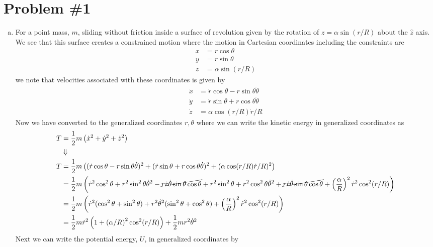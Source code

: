 \documentclass[11pt]{article}
\numberwithin{equation}{section}
\begin{document}


\section{Problem \#1}
\begin{enumerate}[(a)]
\item For a point mass, $m$, sliding without friction inside a surface of revolution given 
by the rotation of $z=\alpha\sin(r/R)$ about the $\hat{z}$ axis. We see that this surface
creates a constrained motion where the motion in Cartesian coordinates including the 
constraints are
\begin{align*} 
x &= r\cos\theta\\
y &= r\sin\theta\\
z &= \alpha\sin(r/R)
\end{align*} 
we note that velocities associated with these coordinates is given by
\begin{align*}
\dot{x} &= \dot{r}\cos\theta-r\sin\theta\dot\theta\\
\dot{y} &= \dot{r}\sin\theta+r\cos\theta\dot\theta\\
\dot{z} &= \alpha\cos(r/R)\dot{r}/R
\end{align*}
Now we have converted to the generalized coordinates $r,\theta$ where we can write the 
kinetic energy in generalized coordinates as
\begin{align*}
T &= \frac{1}{2}m\left(\dot{x}^2+\dot{y}^2+\dot{z}^2\right)\\
&\Downarrow\\
T &= \frac{1}{2}m\left((\dot{r}\cos\theta-r\sin\theta\dot\theta)^2+(\dot{r}\sin\theta+r\cos\theta\dot\theta)^2+(\alpha\cos(r/R)\dot{r}/R)^2\right)\\
&= \frac{1}{2}m\left(\dot{r}^2\cos^2\theta + r^2\sin^2\theta\dot\theta^2 - \cancel{r\dot{r}\dot{\theta}\sin\theta\cos\theta} + \dot{r}^2\sin^2\theta + r^2\cos^2\theta\dot\theta^2 + \cancel{r\dot{r}\dot{\theta}\sin\theta\cos\theta} + \left(\frac{\alpha}{R}\right)^2\dot{r}^2\cos^2(r/R)\right)\\
&= \frac{1}{2}m\left(\dot{r}^2(\cos^2\theta+\sin^2\theta) + r^2\dot\theta^2(\sin^2\theta+\cos^2\theta) + \left(\frac{\alpha}{R}\right)^2\dot{r}^2\cos^2(r/R)\right)\\
&= \frac{1}{2}m\dot{r}^2\left(1+\left(\alpha/R\right)^2\cos^2(r/R)\right)+ \frac{1}{2}mr^2\dot\theta^2
\end{align*}
Next we can write the potential energy, $U$, in generalized coordinates by
\begin{align*}

\end{align*}
\end{enumerate}
\end{document}
